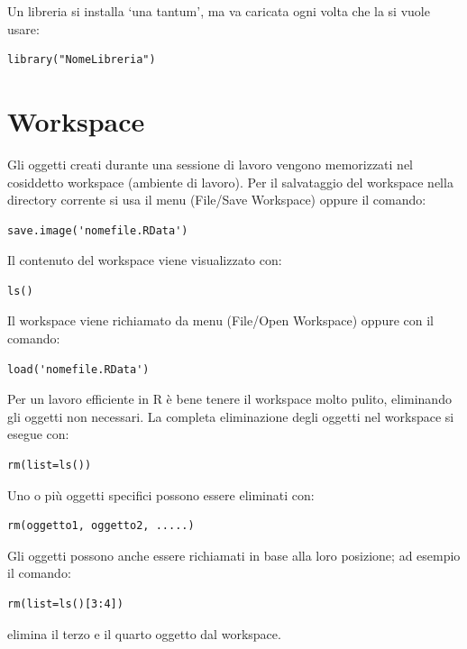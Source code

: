 \documentclass[a4paper,12pt,oneside]{book}
\begin{document}
Un libreria si installa `una tantum', ma va caricata ogni volta che la si vuole usare:

\begin{verbatim}
library("NomeLibreria")
\end{verbatim}

\hypertarget{workspace}{%
\section{Workspace}\label{workspace}}

Gli oggetti creati durante una sessione di lavoro vengono memorizzati nel cosiddetto workspace (ambiente di lavoro). Per il salvataggio del workspace nella directory corrente si usa il menu (File/Save Workspace) oppure il comando:

\begin{verbatim}
save.image('nomefile.RData')
\end{verbatim}

Il contenuto del workspace viene visualizzato con:

\begin{verbatim}
ls()
\end{verbatim}

Il workspace viene richiamato da menu (File/Open Workspace) oppure con il comando:

\begin{verbatim}
load('nomefile.RData')
\end{verbatim}

Per un lavoro efficiente in R è bene tenere il workspace molto pulito, eliminando gli oggetti non necessari. La completa eliminazione degli oggetti nel workspace si esegue con:

\begin{verbatim}
rm(list=ls())
\end{verbatim}

Uno o più oggetti specifici possono essere eliminati con:

\begin{verbatim}
rm(oggetto1, oggetto2, .....)
\end{verbatim}

Gli oggetti possono anche essere richiamati in base alla loro posizione; ad esempio il comando:

\begin{verbatim}
rm(list=ls()[3:4])
\end{verbatim}

elimina il terzo e il quarto oggetto dal workspace.
\end{document}
